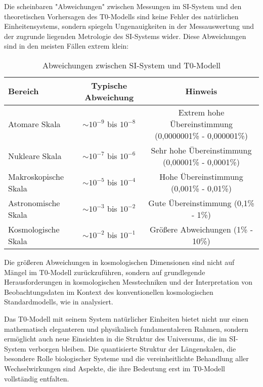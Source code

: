 \documentclass[12pt,a4paper]{article}
\begin{document}
Die scheinbaren "Abweichungen" zwischen Messungen im SI-System und den theoretischen Vorhersagen des T0-Modells sind keine Fehler des natürlichen Einheitensystems, sondern spiegeln Ungenauigkeiten in der Messauswertung und der zugrunde liegenden Metrologie des SI-Systems wider. Diese Abweichungen sind in den meisten Fällen extrem klein:

\begin{table}[H]
	\centering
	\begin{adjustbox}{width=0.95\textwidth}
		\begin{tabular}{lcc}
			\toprule
			\textbf{Bereich} & \textbf{Typische Abweichung} & \textbf{Hinweis} \\
			\midrule
			Atomare Skala & $\sim10^{-9}$ bis $10^{-8}$ & Extrem hohe Übereinstimmung (0,0000001\% - 0,000001\%) \\
			Nukleare Skala & $\sim10^{-7}$ bis $10^{-6}$ & Sehr hohe Übereinstimmung (0,00001\% - 0,0001\%) \\
			Makroskopische Skala & $\sim10^{-5}$ bis $10^{-4}$ & Hohe Übereinstimmung (0,001\% - 0,01\%) \\
			Astronomische Skala & $\sim10^{-3}$ bis $10^{-2}$ & Gute Übereinstimmung (0,1\% - 1\%) \\
			Kosmologische Skala & $\sim10^{-2}$ bis $10^{-1}$ & Größere Abweichungen (1\% - 10\%) \\
			\bottomrule
		\end{tabular}
	\end{adjustbox}
	\caption{Abweichungen zwischen SI-System und T0-Modell}
	\label{tab:deviations}
\end{table}

Die größeren Abweichungen in kosmologischen Dimensionen sind nicht auf Mängel im T0-Modell zurückzuführen, sondern auf grundlegende Herausforderungen in kosmologischen Messtechniken und der Interpretation von Beobachtungsdaten im Kontext des konventionellen kosmologischen Standardmodells, wie in \cite{pascher_messdifferenzen_2025} analysiert.

Das T0-Modell mit seinem System natürlicher Einheiten bietet nicht nur einen mathematisch eleganteren und physikalisch fundamentaleren Rahmen, sondern ermöglicht auch neue Einsichten in die Struktur des Universums, die im SI-System verborgen bleiben. Die quantisierte Struktur der Längenskalen, die besondere Rolle biologischer Systeme und die vereinheitlichte Behandlung aller Wechselwirkungen sind Aspekte, die ihre Bedeutung erst im T0-Modell vollständig entfalten.
\end{document}

